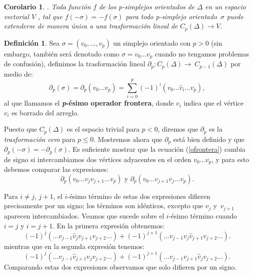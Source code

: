 \documentclass[12pt]{book}
\newtheorem{corollary}[theorem]{Corolario}
\theoremstyle{definition}
\newtheorem{definition}[theorem]{Definición}
\newcounter{in}
\newcounter{ini}
\begin{document}
\begin{corollary}{}.
  Toda función $f$ de los p-simplejos orientados de $\Delta$ en un
  espacio vectorial $V$ , tal que $f(-\sigma)=-f(\sigma)$ para todo
  p-simplejo orientado~$\sigma$ puede extenderse de manera única a una
  trasformación lineal de $C_{p}(\Delta)\rightarrow V$.
\end{corollary}

\begin{definition}
  Sea $\sigma=(v_{0},\ldots ,v_{p})$ un simplejo orientado con $p>0$
  (sin embargo, también será denotado como $\sigma=v_{0}\ldots v_{p}$
  cuando no tengamos problemas de confusión),
  definimos la trasformación lineal
  $\partial_{p}:C_{p}(\Delta)\rightarrow~C_{p-1}(\Delta)$ por medio de:
  \begin{equation}
    \label{ofrontera}
    \partial_{p}(\sigma)=\partial_{p}(v_{0}\ldots
    v_{p})=\sum^{p}_{i=0}(-1)^{i}(v_{0}\ldots \widehat v_{i}\ldots v_{p}),
  \end{equation}
  al que llamamos el \textbf{\emph{p}-ésimo operador frontera}, donde
  $\widehat v_{i}$ indica que el vértice $v_{i}$ es borrado del arreglo.
\end{definition}

Puesto que $C_{p}(\Delta)$ es el espacio trivial para $p<0$, diremos
que $\partial_{p}$ es la \textit{trasformación cero} para $p\leq
0$. Mostremos ahora que $\partial_{p}$ está bien definido y que
$\partial_{p}(-\sigma)=-\partial_{p}(\sigma)$. Es suficiente
mostrar que la ecuación (\ref{ofrontera}) cambia de signo si intercambiamos dos
vértices adyacentes en el orden $v_{0}\ldots v_{p}$, y para esto
debemos comparar las expresiones:
$$\partial_{p}(v_{0}\ldots v_{j} v_{j+1} \ldots v_{p}) \mbox{ y } \partial_{p}(v_{0}\ldots v_{j+1} v_{j} \ldots v_{p}).$$

Para $i\neq j$, $j+1$, el $i$-ésimo término de estas dos expresiones
difieren precisamente por un signo; los términos son idénticos,
excepto que $v_{j}$ y~$v_{j+1}$ aparecen intercambiados. Veamos que
sucede sobre el $i$-ésimo término cuando $i=j$ y $i=j+1$. En la primera
expresión obtenemos:
$$(-1)^{j}(\ldots v_{j-1} \widehat v_{j}v_{j+1}v_{j+2}\ldots)+(-1)^{j+1}(\ldots v_{j-1}v_{j}\widehat v_{j+1}v_{j+2}\ldots).$$
mientras que en la segunda expresión tenemos:
$$(-1)^{j}(\ldots v_{j-1}\widehat v_{j+1}v_{j}v_{j+2}\ldots)+(-1)^{j+1}(\ldots v_{j-1}v_{j+1}\widehat v_{j}v_{j+2}\ldots).$$
Comparando estas dos expresiones observamos que solo difieren por un signo.
\end{document}
